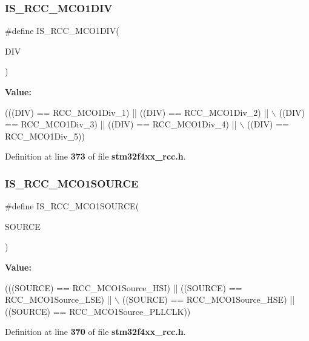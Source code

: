 \subsubsection{I\+S\+\_\+\+R\+C\+C\+\_\+\+M\+C\+O1\+D\+IV}
{\footnotesize\ttfamily \#define I\+S\+\_\+\+R\+C\+C\+\_\+\+M\+C\+O1\+D\+IV(\begin{DoxyParamCaption}\item[{}]{D\+IV }\end{DoxyParamCaption})}

{\bfseries Value\+:}
\begin{DoxyCode}
(((DIV) == RCC_MCO1Div_1) || ((DIV) == RCC_MCO1Div_2) || \(\backslash\)
                             ((DIV) == RCC_MCO1Div_3) || ((DIV) == RCC_MCO1Div_4) || \(\backslash\)
                             ((DIV) == RCC_MCO1Div_5))
\end{DoxyCode}


Definition at line \textbf{ 373} of file \textbf{ stm32f4xx\+\_\+rcc.\+h}.

\mbox{\label{group__RCC__MCO1__Clock__Source__Prescaler_ga073031d9c90c555f7874912b7e4905f6}} 
\subsubsection{I\+S\+\_\+\+R\+C\+C\+\_\+\+M\+C\+O1\+S\+O\+U\+R\+CE}
{\footnotesize\ttfamily \#define I\+S\+\_\+\+R\+C\+C\+\_\+\+M\+C\+O1\+S\+O\+U\+R\+CE(\begin{DoxyParamCaption}\item[{}]{S\+O\+U\+R\+CE }\end{DoxyParamCaption})}

{\bfseries Value\+:}
\begin{DoxyCode}
(((SOURCE) == RCC_MCO1Source_HSI) || ((SOURCE) == RCC_MCO1Source_LSE) || \(\backslash\)
                                   ((SOURCE) == RCC_MCO1Source_HSE) || ((SOURCE) == 
      RCC_MCO1Source_PLLCLK))
\end{DoxyCode}


Definition at line \textbf{ 370} of file \textbf{ stm32f4xx\+\_\+rcc.\+h}.

